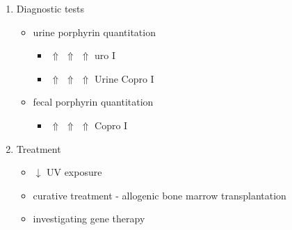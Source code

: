 \documentclass{scrartcl}
\begin{document}
\begin{enumerate}
\item Diagnostic tests
\label{sec:orgc05d496}
\begin{itemize}
\item urine porphyrin quantitation
\begin{itemize}
\item \(\Uparrow\) \(\Uparrow\) \(\Uparrow\)  uro I
\item \(\Uparrow\) \(\Uparrow\) \(\Uparrow\) Urine Copro I
\end{itemize}
\item fecal porphyrin quantitation
\begin{itemize}
\item \(\Uparrow\) \(\Uparrow\) \(\Uparrow\) Copro I
\end{itemize}
\end{itemize}

\item Treatment
\label{sec:orgd538d6e}
\begin{itemize}
\item \(\downarrow\) UV exposure
\item curative treatment - allogenic bone marrow transplantation
\item investigating gene therapy
\end{itemize}
\end{enumerate}
\end{document}
